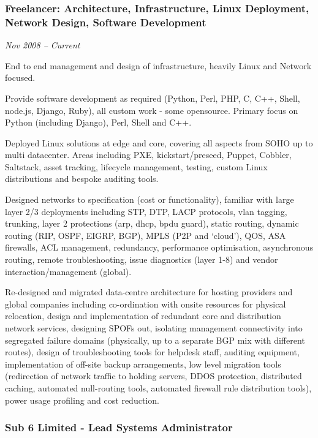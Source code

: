 \subsubsection{Freelancer: Architecture, Infrastructure, Linux
Deployment, Network Design, Software Development}

\emph{Nov 2008 -- Current}

End to end management and design of infrastructure, heavily Linux and
Network focused.

Provide software development as required (Python, Perl, PHP, C, C++,
Shell, node.js, Django, Ruby), all custom work - some opensource.
Primary focus on Python (including Django), Perl, Shell and C++.

Deployed Linux solutions at edge and core, covering all aspects from
SOHO up to multi datacenter. Areas including PXE, kickstart/preseed,
Puppet, Cobbler, Saltstack, asset tracking, lifecycle management,
testing, custom Linux distributions and bespoke auditing tools.

Designed networks to specification (cost or functionality), familiar
with large layer 2/3 deployments including STP, DTP, LACP protocols,
vlan tagging, trunking, layer 2 protections (arp, dhcp, bpdu guard),
static routing, dynamic routing (RIP, OSPF, EIGRP, BGP), MPLS (P2P and
`cloud'), QOS, ASA firewalls, ACL management, redundancy, performance
optimisation, asynchronous routing, remote troubleshooting, issue
diagnostics (layer 1-8) and vendor interaction/management (global).

Re-designed and migrated data-centre architecture for hosting providers
and global companies including co-ordination with onsite resources for
physical relocation, design and implementation of redundant core and
distribution network services, designing SPOFs out, isolating management
connectivity into segregated failure domains (physically, up to a
separate BGP mix with different routes), design of troubleshooting tools
for helpdesk staff, auditing equipment, implementation of off-site
backup arrangements, low level migration tools (redirection of network
traffic to holding servers, DDOS protection, distributed caching,
automated null-routing tools, automated firewall rule distribution
tools), power usage profiling and cost reduction.

\subsubsection{Sub 6 Limited - Lead Systems Administrator}

